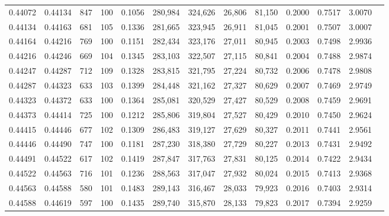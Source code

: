 \begin{tabular}{rrrrrrrrrrrrr}
0.44072 & 0.44134 &   847 & 100 &                                     0.1056 & 280,984 & 324,626 &  26,806 &  81,150 & 0.2000 & 0.7517 & 3.0070 \\
0.44134 & 0.44163 &   681 & 105 &                                     0.1336 & 281,665 & 323,945 &  26,911 &  81,045 & 0.2001 & 0.7507 & 3.0007 \\
0.44164 & 0.44216 &   769 & 100 &                                     0.1151 & 282,434 & 323,176 &  27,011 &  80,945 & 0.2003 & 0.7498 & 2.9936 \\
0.44216 & 0.44246 &   669 & 104 &                                     0.1345 & 283,103 & 322,507 &  27,115 &  80,841 & 0.2004 & 0.7488 & 2.9874 \\
0.44247 & 0.44287 &   712 & 109 &                                     0.1328 & 283,815 & 321,795 &  27,224 &  80,732 & 0.2006 & 0.7478 & 2.9808 \\
0.44287 & 0.44323 &   633 & 103 &                                     0.1399 & 284,448 & 321,162 &  27,327 &  80,629 & 0.2007 & 0.7469 & 2.9749 \\
0.44323 & 0.44372 &   633 & 100 &                                     0.1364 & 285,081 & 320,529 &  27,427 &  80,529 & 0.2008 & 0.7459 & 2.9691 \\
0.44373 & 0.44414 &   725 & 100 &                                     0.1212 & 285,806 & 319,804 &  27,527 &  80,429 & 0.2010 & 0.7450 & 2.9624 \\
0.44415 & 0.44446 &   677 & 102 &                                     0.1309 & 286,483 & 319,127 &  27,629 &  80,327 & 0.2011 & 0.7441 & 2.9561 \\
0.44446 & 0.44490 &   747 & 100 &                                     0.1181 & 287,230 & 318,380 &  27,729 &  80,227 & 0.2013 & 0.7431 & 2.9492 \\
0.44491 & 0.44522 &   617 & 102 &                                     0.1419 & 287,847 & 317,763 &  27,831 &  80,125 & 0.2014 & 0.7422 & 2.9434 \\
0.44522 & 0.44563 &   716 & 101 &                                     0.1236 & 288,563 & 317,047 &  27,932 &  80,024 & 0.2015 & 0.7413 & 2.9368 \\
0.44563 & 0.44588 &   580 & 101 &                                     0.1483 & 289,143 & 316,467 &  28,033 &  79,923 & 0.2016 & 0.7403 & 2.9314 \\
0.44588 & 0.44619 &   597 & 100 &                                     0.1435 & 289,740 & 315,870 &  28,133 &  79,823 & 0.2017 & 0.7394 & 2.9259 \\

\end{tabular}
